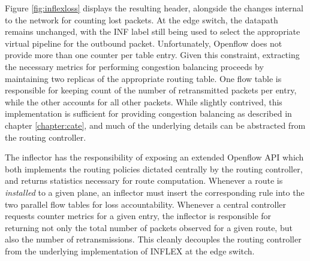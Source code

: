 Figure \ref{fig:inflexloss} displays the resulting header, alongside the changes internal to the network for counting lost packets.
At the edge switch, the datapath remains unchanged, with the \ac{INF} label still being used to select the appropriate virtual pipeline for the outbound packet.
Unfortunately, Openflow does not provide more than one counter per table entry.
Given this constraint, extracting the necessary metrics for performing congestion balancing proceeds by maintaining two replicas of the appropriate routing table.
One flow table is responsible for keeping count of the number of retransmitted packets per entry, while the other accounts for all other packets.
While slightly contrived, this implementation is sufficient for providing congestion balancing as described in chapter \ref{chapter:cate}, and much of the underlying details can be abstracted from the routing controller.

The inflector has the responsibility of exposing an extended Openflow \ac{API} which both implements the routing policies dictated centrally by the routing controller, and returns statistics necessary for route computation.
Whenever a route is \emph{installed} to a given plane, an inflector must insert the corresponding rule into the two parallel flow tables for loss accountability.
Whenever a central controller requests counter metrics for a given entry, the inflector is responsible for returning not only the total number of packets observed for a given route, but also the number of retransmissions.
This cleanly decouples the routing controller from the underlying implementation of INFLEX at the edge switch.
